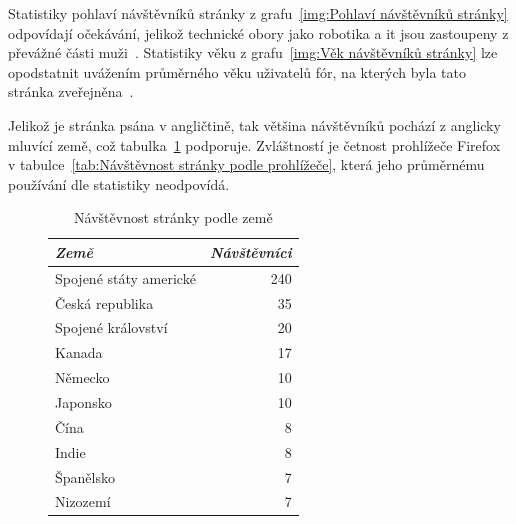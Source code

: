 \documentclass[a4paper, 12pt, twoside]{article}
\newcommand{\ra}[1]{\renewcommand{\arraystretch}{#1}} %
\begin{document}
  Statistiky pohlaví návštěvníků stránky z grafu~\ref{img:Pohlaví návštěvníků stránky} odpovídají očekávání, jelikož technické obory jako robotika a \gls{it} jsou zastoupeny z převážné části muži~\cite{women-in-stem}. Statistiky věku z grafu~\ref{img:Věk návštěvníků stránky} lze opodstatnit uvážením průměrného věku uživatelů fór, na kterých byla tato stránka zveřejněna~\cite{reddit-demographics}.

  Jelikož je stránka psána v angličtině, tak většina návštěvníků pochází z anglicky mluvící země, což tabulka~\ref{tab:Návštěvnost stránky podle země} podporuje. Zvláštností je četnost prohlížeče Firefox v tabulce~\ref{tab:Návštěvnost stránky podle prohlížeče}, která jeho průměrnému používání dle statistiky \cite{browser-statistics} neodpovídá.

  \begin{figure}[H]
    \begin{minipage}[b]{0.475\textwidth}
      \begin{table}[H]
        \caption{Návštěvnost stránky podle země}
        \label{tab:Návštěvnost stránky podle země}
        \footnotesize
        \centering
        \ra{1.3}
        \begin{tabular}{lr}
          \toprule
          \emph{Země} & \emph{Návštěvníci} \\
          \midrule
          Spojené státy americké & \num{240} \\
          Česká republika	       & \num{35} \\
          Spojené království     & \num{20} \\
          Kanada                 & \num{17} \\
          Německo                & \num{10} \\
          Japonsko               & \num{10} \\
          Čína                   & \num{8} \\
          Indie                  & \num{8} \\
          Španělsko              & \num{7} \\
          Nizozemí               & \num{7} \\
          \bottomrule
        \end{tabular}
      \end{table}
    \end{minipage}\hfill
    \begin{minipage}[b]{0.475\textwidth}
      \begin{table}[H]

\end{table}
\end{minipage}
\end{figure}
\end{document}
